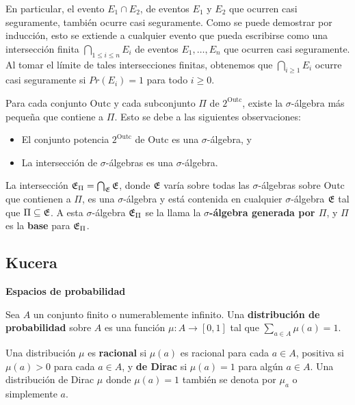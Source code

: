 En particular, el evento \(E_1 \cap E_2\), de eventos \(E_1\) y \(E_2\) que
ocurren casi seguramente, también ocurre casi seguramente. Como se puede
demostrar por inducción, esto se extiende a cualquier evento que pueda
escribirse como una intersección finita \(\bigcap_{1 \leq i \leq n} E_i\) de
eventos \(E_1, \dots, E_n\) que ocurren casi seguramente. Al tomar el límite de
tales intersecciones finitas, obtenemos que \(\bigcap_{i \geq 1} E_i\) ocurre
casi seguramente si \(Pr(E_i) = 1\) para todo \(i \geq 0\).

Para cada conjunto \(\text{Outc}\) y cada subconjunto \(\Pi\) de
\(2^{\text{Outc}}\), existe la \(\sigma\)-álgebra más pequeña que contiene a
\(\Pi\). Esto se debe a las siguientes observaciones:

\begin{itemize}
	\item El conjunto potencia \(2^{\text{Outc}}\) de \(\text{Outc}\) es una
	      \(\sigma\)-álgebra, y
	\item La intersección de \(\sigma\)-álgebras es una \(\sigma\)-álgebra.
\end{itemize}

La intersección \(\mathfrak{E}_\Pi = \bigcap_{\mathfrak{E}} \mathfrak{E}\), donde \(\mathfrak{E}\)
varía sobre todas las \(\sigma\)-álgebras sobre \(\text{Outc}\) que contienen a
\(\Pi\), es una \(\sigma\)-álgebra y está contenida en cualquier
\(\sigma\)-álgebra \(\mathfrak{E}\) tal que \(\Pi \subseteq \mathfrak{E}\). A esta
\(\sigma\)-álgebra \(\mathfrak{E}_\Pi\) se la llama la \textbf{\(\sigma\)-álgebra
	generada por \(\Pi\)}, y \(\Pi\) es la \textbf{base} para \(\mathfrak{E}_\Pi\).

\subsection{Kucera}

\textbf{Espacios de probabilidad}

Sea \( A \) un conjunto finito o numerablemente infinito. Una
\textbf{distribución de probabilidad} sobre \( A \) es una función \( \mu : A
\rightarrow [0, 1] \) tal que \( \sum_{a \in A} \mu(a) = 1 \).

Una distribución \( \mu \) es \textbf{racional} si \( \mu(a) \) es racional
para cada \( a \in A \), positiva si \( \mu(a) > 0 \) para cada \( a \in A \),
y \textbf{de Dirac} si \( \mu(a) = 1 \) para algún \( a \in A \). Una
distribución de Dirac \( \mu \) donde \( \mu(a) = 1 \) también se denota por \(
\mu_a \) o simplemente \( a \).

